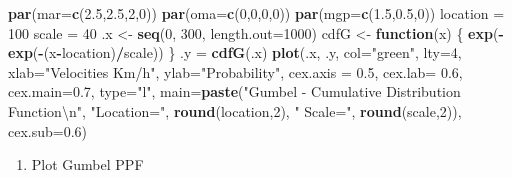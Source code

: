 \documentclass[12pt,oneside]{reedthesis}
\newenvironment{Shaded}{\begin{snugshade}}{\end{snugshade}}
\newcommand{\CharTok}[1]{\textcolor[rgb]{0.31,0.60,0.02}{#1}}
\newcommand{\ControlFlowTok}[1]{\textcolor[rgb]{0.13,0.29,0.53}{\textbf{#1}}}
\newcommand{\DataTypeTok}[1]{\textcolor[rgb]{0.13,0.29,0.53}{#1}}
\newcommand{\DecValTok}[1]{\textcolor[rgb]{0.00,0.00,0.81}{#1}}
\newcommand{\FloatTok}[1]{\textcolor[rgb]{0.00,0.00,0.81}{#1}}
\newcommand{\KeywordTok}[1]{\textcolor[rgb]{0.13,0.29,0.53}{\textbf{#1}}}
\newcommand{\NormalTok}[1]{#1}
\newcommand{\OperatorTok}[1]{\textcolor[rgb]{0.81,0.36,0.00}{\textbf{#1}}}
\newcommand{\StringTok}[1]{\textcolor[rgb]{0.31,0.60,0.02}{#1}}
\providecommand{\tightlist}{%
  \setlength{\itemsep}{0pt}\setlength{\parskip}{0pt}}
\begin{document}
\vspace{0.4cm}
\begin{Shaded}
\begin{Highlighting}[]
\KeywordTok{par}\NormalTok{(}\DataTypeTok{mar=}\KeywordTok{c}\NormalTok{(}\FloatTok{2.5}\NormalTok{,}\FloatTok{2.5}\NormalTok{,}\DecValTok{2}\NormalTok{,}\DecValTok{0}\NormalTok{))}
\KeywordTok{par}\NormalTok{(}\DataTypeTok{oma=}\KeywordTok{c}\NormalTok{(}\DecValTok{0}\NormalTok{,}\DecValTok{0}\NormalTok{,}\DecValTok{0}\NormalTok{,}\DecValTok{0}\NormalTok{))}
\KeywordTok{par}\NormalTok{(}\DataTypeTok{mgp=}\KeywordTok{c}\NormalTok{(}\FloatTok{1.5}\NormalTok{,}\FloatTok{0.5}\NormalTok{,}\DecValTok{0}\NormalTok{))}
\NormalTok{location =}\StringTok{ }\DecValTok{100}
\NormalTok{scale =}\StringTok{ }\DecValTok{40}
\NormalTok{.x <-}\StringTok{ }\KeywordTok{seq}\NormalTok{(}\DecValTok{0}\NormalTok{, }\DecValTok{300}\NormalTok{, }\DataTypeTok{length.out=}\DecValTok{1000}\NormalTok{)}
\NormalTok{cdfG <-}\StringTok{ }\ControlFlowTok{function}\NormalTok{(x) \{}
  \KeywordTok{exp}\NormalTok{(}\OperatorTok{-}\KeywordTok{exp}\NormalTok{(}\OperatorTok{-}\NormalTok{(x}\OperatorTok{-}\NormalTok{location)}\OperatorTok{/}\NormalTok{scale))}
\NormalTok{  \}}
\NormalTok{.y =}\StringTok{ }\KeywordTok{cdfG}\NormalTok{(.x)}
\KeywordTok{plot}\NormalTok{(.x, .y, }\DataTypeTok{col=}\StringTok{"green"}\NormalTok{, }\DataTypeTok{lty=}\DecValTok{4}\NormalTok{, }\DataTypeTok{xlab=}\StringTok{"Velocities Km/h"}\NormalTok{, }\DataTypeTok{ylab=}\StringTok{"Probability"}\NormalTok{, }\DataTypeTok{cex.axis =} \FloatTok{0.5}\NormalTok{, }\DataTypeTok{cex.lab=} \FloatTok{0.6}\NormalTok{, }\DataTypeTok{cex.main=}\FloatTok{0.7}\NormalTok{, }\DataTypeTok{type=}\StringTok{"l"}\NormalTok{,}
 \DataTypeTok{main=}\KeywordTok{paste}\NormalTok{(}\StringTok{"Gumbel - Cumulative Distribution Function}\CharTok{\textbackslash{}n}\StringTok{"}\NormalTok{, }\StringTok{"Location="}\NormalTok{, }\KeywordTok{round}\NormalTok{(location,}\DecValTok{2}\NormalTok{), }\StringTok{" Scale="}\NormalTok{, }\KeywordTok{round}\NormalTok{(scale,}\DecValTok{2}\NormalTok{)), }\DataTypeTok{cex.sub=}\FloatTok{0.6}\NormalTok{)}
\end{Highlighting}
\end{Shaded}
\normalsize
\begin{enumerate}
\def\labelenumi{\arabic{enumi}.}
\setcounter{enumi}{3}
\tightlist
\item
  Plot Gumbel PPF
\end{enumerate}
\tiny
\end{document}
